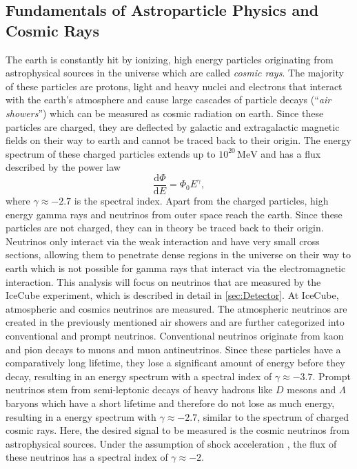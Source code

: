 \subsection{Fundamentals of Astroparticle Physics and Cosmic Rays}
The earth is constantly hit by ionizing, high energy particles originating from astrophysical sources in the universe which are called \textit{cosmic rays}. 
The majority of these particles are protons, light and heavy nuclei and electrons that interact with the earth's atmosphere and cause large cascades of particle decays 
(\enquote{\textit{air showers}})
which can be measured as cosmic radiation on earth. Since these particles are charged, they are deflected by galactic and extragalactic magnetic fields on their way to earth and 
cannot be traced back to their origin. The energy spectrum of these charged particles extends up to $10^{20}\, \unit{\mega\eV}$ and has a flux described by the power law 
\begin{equation}
    \frac{\mathrm{d}\Phi}{\mathrm{d}E} = \Phi_0 E^\gamma,
    \label{eq:flux}
\end{equation}
where $\gamma \approx \num{-2.7}$ is the spectral index.
Apart from the charged particles, high energy gamma rays and neutrinos from outer space reach the earth. Since these particles are not charged, they can in theory be 
traced back to their origin. Neutrinos only interact via the weak interaction and have very small cross sections, allowing them to penetrate dense regions in the universe on 
their way to earth which is not possible for gamma rays that interact via the electromagnetic interaction.
This analysis will focus on neutrinos that are measured by the IceCube experiment, which is described in detail in \autoref{sec:Detector}.
At IceCube, atmospheric and cosmics neutrinos are measured. The atmospheric neutrinos are created in the previously mentioned air showers and are further categorized into 
conventional and prompt neutrinos. Conventional neutrinos originate from kaon and pion decays to muons and muon antineutrinos. Since these particles have a comparatively long
lifetime, they lose a significant amount of energy before they decay, resulting in an energy spectrum with a spectral index of $\gamma \approx \num{-3.7}$. 
Prompt neutrinos stem from semi-leptonic decays of heavy hadrons like $D$ mesons and $\Lambda$ baryons which have a short lifetime and therefore do not lose as much energy,
resulting in a energy spectrum with $\gamma \approx \num{-2.7}$, similar to the spectrum of charged cosmic rays. Here, the desired signal to be measured is the cosmic neutrinos from astrophysical sources. 
Under the assumption of shock acceleration \cite{Fermi1949}, the flux of these neutrinos has a spectral index of $\gamma \approx \num{-2}$.

